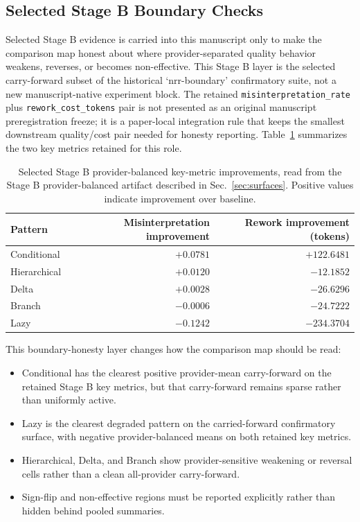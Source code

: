 \documentclass[11pt,a4paper]{article}
\begin{document}
\subsection{Selected Stage B Boundary Checks}

Selected Stage B evidence is carried into this manuscript only to make the comparison map honest about where provider-separated quality behavior weakens, reverses, or becomes non-effective. This Stage B layer is the selected carry-forward subset of the historical `nrr-boundary' confirmatory suite, not a new manuscript-native experiment block. The retained \texttt{misinterpretation\_rate} plus \texttt{rework\_cost\_tokens} pair is not presented as an original manuscript preregistration freeze; it is a paper-local integration rule that keeps the smallest downstream quality/cost pair needed for honesty reporting. Table~\ref{tab:stageb_selected_integrated} summarizes the two key metrics retained for this role.

\begin{table}[t]
\centering
\small
\begin{tabular}{lrr}
\toprule
\textbf{Pattern} & \textbf{Misinterpretation improvement} & \textbf{Rework improvement (tokens)} \\
\midrule
Conditional & \(+0.0781\) & \(+122.6481\) \\
Hierarchical & \(+0.0120\) & \(-12.1852\) \\
Delta & \(+0.0028\) & \(-26.6296\) \\
Branch & \(-0.0006\) & \(-24.7222\) \\
Lazy & \(-0.1242\) & \(-234.3704\) \\
\bottomrule
\end{tabular}
\caption{Selected Stage B provider-balanced key-metric improvements, read from the Stage B provider-balanced artifact described in Sec.~\ref{sec:surfaces}. Positive values indicate improvement over baseline.}
\label{tab:stageb_selected_integrated}
\end{table}

This boundary-honesty layer changes how the comparison map should be read:
\begin{itemize}
  \item Conditional has the clearest positive provider-mean carry-forward on the retained Stage B key metrics, but that carry-forward remains sparse rather than uniformly active.
  \item Lazy is the clearest degraded pattern on the carried-forward confirmatory surface, with negative provider-balanced means on both retained key metrics.
  \item Hierarchical, Delta, and Branch show provider-sensitive weakening or reversal cells rather than a clean all-provider carry-forward.
  \item Sign-flip and non-effective regions must be reported explicitly rather than hidden behind pooled summaries.
\end{itemize}
\end{document}
